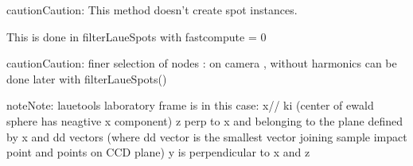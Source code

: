 \documentclass[letterpaper,10pt,english]{sphinxmanual}
\begin{document}
\begin{fulllineitems}
\begin{quote}
\begin{description}
\begin{itemize}
\end{itemize}


\end{description}\end{quote}

\begin{sphinxadmonition}{caution}{Caution:}
This method doesn’t create spot instances.

This is done in filterLaueSpots with fastcompute = 0
\end{sphinxadmonition}

\begin{sphinxadmonition}{caution}{Caution:}
finer selection of nodes : on camera , without harmonics can be
done later with filterLaueSpots()
\end{sphinxadmonition}

\begin{sphinxadmonition}{note}{Note:}
lauetools laboratory frame is in this case:
x// ki (center of ewald sphere has neagtive x component)
z perp to x and belonging to the plane defined by x and dd vectors
(where dd vector is the smallest vector joining sample impact point and points on CCD plane)
y is perpendicular to x and z
\end{sphinxadmonition}

\end{fulllineitems}

\end{document}
